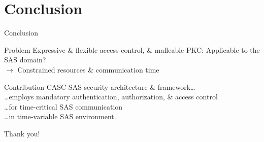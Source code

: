 \documentclass[en]{sdqbeamer}
\begin{document}
\section{Conclusion}
\begin{frame}{Conclusion}
    \begin{redblock}{Problem}
        Expressive \& flexible access control, \& malleable PKC: Applicable to the SAS domain?
        \\$\rightarrow$ Constrained resources \& communication time
    \end{redblock}
    \begin{blueblock}{Contribution}
        CASC-SAS security architecture \& framework\dots
        \\\dots employs mandatory authentication, authorization, \& access control
        \\\dots for time-critical SAS communication
        \\\dots in time-variable SAS environment.
    \end{blueblock}
    \vspace{0.5em}
    \centering
    \huge
    Thank you!
\end{frame}

\appendix
\beginbackup
\end{document}
